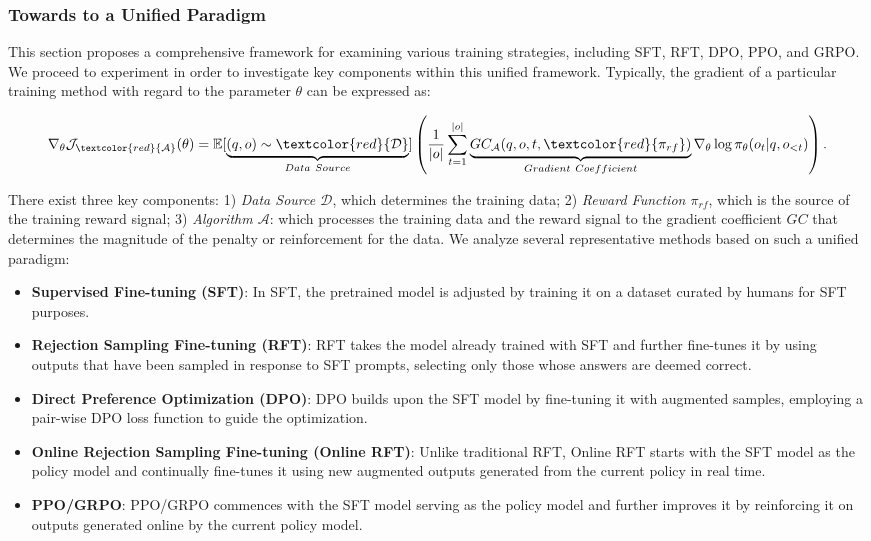 \subsubsection{Towards to a Unified Paradigm} This section proposes a comprehensive framework for examining various training strategies, including SFT, RFT, DPO, PPO, and GRPO. We proceed to experiment in order to investigate key components within this unified framework. Typically, the gradient of a particular training method with regard to the parameter $\theta$ can be expressed as:

\begin{equation}
    \nabla_{\theta}\mathcal{J}_{\textcolor{red}{\mathcal{A}}}(\theta) = \mathbb{E}[\underbrace{(q,o) \sim \textcolor{red}{\mathcal{D}}}_{Data \ Source}]\left( \frac{1}{|o|} \sum_{t=1}^{|o|}  \underbrace{GC_{{\mathcal{A}}}(q, o, t, \textcolor{red}{\pi_{{rf}}})}_{Gradient \ Coefficient}  \nabla_{\theta}\log \pi_{\theta}(o_t | q, o_{<t})\right).
\label{eq:objective}
\end{equation}

There exist three key components: 1) \textit{Data Source $\mathcal{D}$}, which determines the training data; 2) \textit{Reward Function $\pi_{{rf}}$}, which is the source of the training reward signal; 3) \textit{Algorithm $\mathcal{A}$}: which processes the training data and the reward signal to the gradient coefficient $GC$ that determines the magnitude of the penalty or reinforcement for the data. We analyze several representative methods based on such a unified paradigm:

\begin{itemize}
    \item  \textbf{Supervised Fine-tuning (SFT)}: In SFT, the pretrained model is adjusted by training it on a dataset curated by humans for SFT purposes.
    \item \textbf{Rejection Sampling Fine-tuning (RFT)}: RFT takes the model already trained with SFT and further fine-tunes it by using outputs that have been sampled in response to SFT prompts, selecting only those whose answers are deemed correct.
    \item \textbf{Direct Preference Optimization (DPO)}: DPO builds upon the SFT model by fine-tuning it with augmented samples, employing a pair-wise DPO loss function to guide the optimization.
    \item \textbf{Online Rejection Sampling Fine-tuning (Online RFT)}: Unlike traditional RFT, Online RFT starts with the SFT model as the policy model and continually fine-tunes it using new augmented outputs generated from the current policy in real time.
    \item \textbf{PPO/GRPO}: PPO/GRPO commences with the SFT model serving as the policy model and further improves it by reinforcing it on outputs generated online by the current policy model.
\end{itemize}

